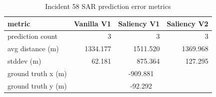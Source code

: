 \begin{table}[ht]
\centering
\caption{Incident 58 SAR prediction error metrics}
\label{tab:sar-incident-58}
\begin{tabular}{lrrr}
\hline
metric & Vanilla V1 & Saliency V1 & Saliency V2 \\
\hline
prediction count & 3 & 3 & 3 \\
avg distance (m) & 1334.177 & 1511.520 & 1369.968 \\
stddev (m) & 62.181 & 875.364 & 127.295 \\
ground truth x (m) & \multicolumn{3}{c}{-909.881} \\
ground truth y (m) & \multicolumn{3}{c}{-92.292} \\
\hline
\end{tabular}
\end{table}
